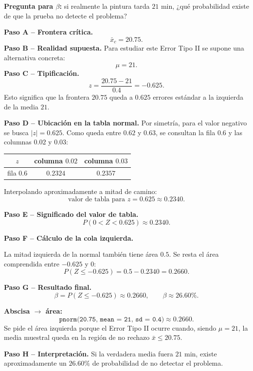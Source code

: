 \documentclass[11pt,a4paper]{article}
\begin{document}
\textbf{Pregunta para $\beta$:} si realmente la pintura tarda $21$ min, ¿qué probabilidad existe de que la prueba no detecte el problema?

\textbf{Paso A -- Frontera crítica.}
\[
\bar{x}_c=20.75.
\]
\textbf{Paso B -- Realidad supuesta.} Para estudiar este Error Tipo II se supone una alternativa concreta:
\[
\mu=21.
\]
\textbf{Paso C -- Tipificación.}
\[
z=\frac{20.75-21}{0.4}=-0.625.
\]
Esto significa que la frontera $20.75$ queda a $0.625$ errores estándar a la izquierda de la media $21$.

\textbf{Paso D -- Ubicación en la tabla normal.} Por simetría, para el valor negativo se busca $|z|=0.625$. Como queda entre $0.62$ y $0.63$, se consultan la fila $0.6$ y las columnas $0.02$ y $0.03$:
\begin{center}
\renewcommand{\arraystretch}{1.25}
\begin{tabular}{c|cc}
\toprule
$z$ & columna $0.02$ & columna $0.03$\\
\midrule
fila $0.6$ & \cellcolor{altorange!18}$0.2324$ & \cellcolor{altorange!18}$0.2357$\\
\bottomrule
\end{tabular}
\end{center}
Interpolando aproximadamente a mitad de camino:
\[
\boxed{\text{valor de tabla para }z=0.625\approx0.2340}.
\]

\textbf{Paso E -- Significado del valor de tabla.}
\[
P(0<Z<0.625)\approx0.2340.
\]

\textbf{Paso F -- Cálculo de la cola izquierda.}
\begin{regla}
La mitad izquierda de la normal también tiene área $0.5$. Se resta el área comprendida entre $-0.625$ y $0$:
\[
P(Z\le-0.625)=\boxed{0.5-0.2340}=0.2660.
\]
\end{regla}

\textbf{Paso G -- Resultado final.}
\[
\boxed{\beta=P(Z\le-0.625)\approx0.2660},
\qquad
\boxed{\beta\approx26.60\%}.
\]

\begin{calculor}
\textbf{Abscisa $\rightarrow$ área:}
\[
\texttt{pnorm(20.75, mean = 21, sd = 0.4)}\approx0.2660.
\]
Se pide el área izquierda porque el Error Tipo II ocurre cuando, siendo $\mu=21$, la media muestral queda en la región de no rechazo $\bar{x}\le20.75$.
\end{calculor}

\textbf{Paso H -- Interpretación.} Si la verdadera media fuera $21$ min, existe aproximadamente un $26.60\%$ de probabilidad de no detectar el problema.
\end{document}
